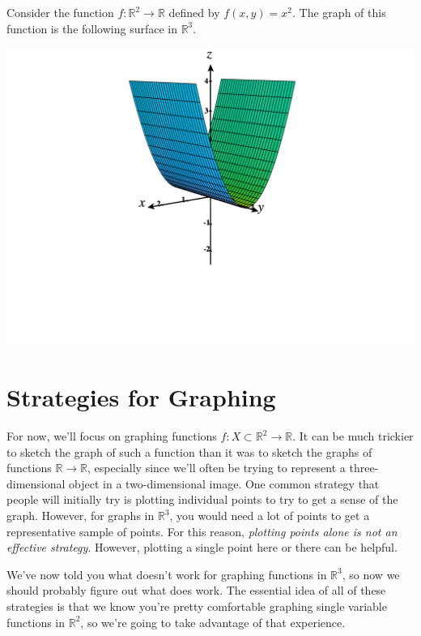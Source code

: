 \documentclass{ximera}
\begin{document}
\begin{example}
Consider the function $f:\mathbb{R}^2\rightarrow\mathbb{R}$ defined by $f(x,y) = x^2$. The graph of this function is the following surface in $\mathbb{R}^3$.

\begin{image}
\includegraphics[width = \textwidth]{CalcPlot3D-x2}
\end{image}
\end{example}

\section*{Strategies for Graphing}

For now, we'll focus on graphing functions $f:X\subset\mathbb{R}^2\rightarrow\mathbb{R}$. It can be much trickier to sketch the graph of such a function than it was to sketch the graphs of functions $\mathbb{R}\rightarrow\mathbb{R}$, especially since we'll often be trying to represent a three-dimensional object in a two-dimensional image. One common strategy that people will initially try is plotting individual points to try to get a sense of the graph. However, for graphs in $\mathbb{R}^3$, you would need a lot of points to get a representative sample of points. For this reason, \emph{plotting points alone is not an effective strategy}. However, plotting a single point here or there can be helpful.

We've now told you what doesn't work for graphing functions in $\mathbb{R}^3$, so now we should probably figure out what does work. The essential idea of all of these strategies is that we know you're pretty comfortable graphing single variable functions in $\mathbb{R}^2$, so we're going to take advantage of that experience.
\end{document}
